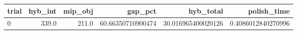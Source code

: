 \begin{tabular}{lrrrrr}
\hline
trial & hyb_int & mip_obj & gap_pct & hyb_total & polish_time \\ \hline
0 & 339.0 & 211.0 & 60.66350710900474 & 30.016965400020126 & 0.4086012840270996 \\
\hline
\end{tabular}
